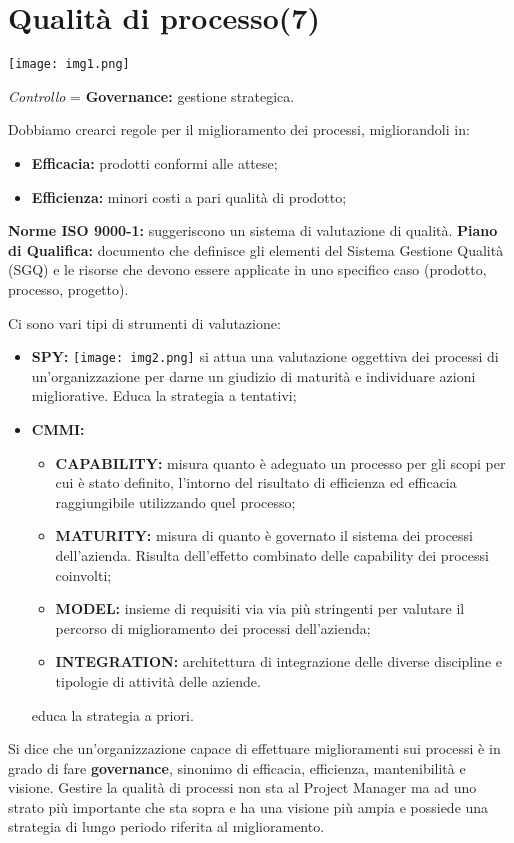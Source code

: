 



\section{Qualità di processo(7)}

\texttt{[image: img1.png]} %

\textit{Controllo} = \textbf{Governance:} gestione strategica.

Dobbiamo crearci regole per il miglioramento dei processi, migliorandoli in:
\begin{itemize}
	\item \textbf{Efficacia:} prodotti conformi alle attese;
	\item \textbf{Efficienza:} minori costi a pari qualità di prodotto; 
\end{itemize} 

\textbf{Norme ISO 9000-1:} suggeriscono un sistema di valutazione di qualità.
\textbf{Piano di Qualifica:} documento che definisce gli elementi del Sistema Gestione Qualità (SGQ) e le risorse che devono essere applicate in uno specifico caso (prodotto, processo, progetto).

Ci sono vari tipi di strumenti di valutazione:
\begin{itemize}
	\item \textbf{SPY:}
\texttt{[image: img2.png]} 
 si attua una valutazione oggettiva dei processi di un'organizzazione per darne un giudizio di maturità e individuare azioni migliorative. Educa la strategia a tentativi;
 	\item \textbf{CMMI:}
 		\begin{itemize}
 			\item \textbf{CAPABILITY:} misura quanto è adeguato un processo per gli scopi per cui è stato definito, l'intorno del risultato di efficienza ed efficacia raggiungibile utilizzando quel processo;
 			\item \textbf{MATURITY:} misura di quanto è governato il sistema dei processi dell'azienda. Risulta dell'effetto combinato delle capability dei processi coinvolti;
 			\item \textbf{MODEL:} insieme di requisiti via via più stringenti per valutare il percorso di miglioramento dei processi dell'azienda;
 			\item \textbf{INTEGRATION:} architettura di integrazione delle diverse discipline e tipologie di attività delle aziende.
 		\end{itemize}
 		educa la strategia a priori.
	
\end{itemize} 
Si dice che un'organizzazione capace di effettuare miglioramenti sui processi è in grado di fare \textbf{governance}, sinonimo di efficacia, efficienza, mantenibilità e visione. Gestire la qualità di processi non sta al Project Manager ma ad uno strato più importante che sta sopra e ha una visione più ampia e possiede una strategia di lungo periodo riferita al miglioramento.

